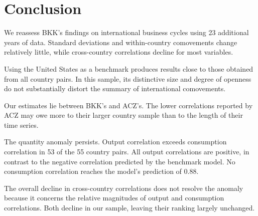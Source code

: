 \section{Conclusion}\label{Sec:Conc}

We reassess BKK's findings on international business cycles using 23 additional years of data. Standard deviations and within-country comovements change relatively little, while cross-country correlations decline for most variables.

Using the United States as a benchmark produces results close to those obtained from all country pairs. In this sample, its distinctive size and degree of openness do not substantially distort the summary of international comovements.

Our estimates lie between BKK's and ACZ's. The lower correlations reported by ACZ may owe more to their larger country sample than to the length of their time series.

The quantity anomaly persists. Output correlation exceeds consumption correlation in 53 of the 55 country pairs. All output correlations are positive, in contrast to the negative correlation predicted by the benchmark model. No consumption correlation reaches the model's prediction of 0.88.

The overall decline in cross-country correlations does not resolve the anomaly because it concerns the relative magnitudes of output and consumption correlations. Both decline in our sample, leaving their ranking largely unchanged.